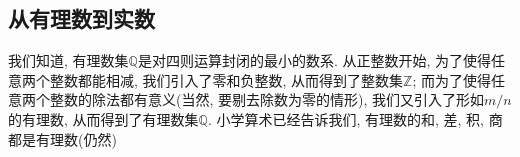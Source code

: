 
\subsection{从有理数到实数}

我们知道, 有理数集$\mathbb{Q}$是对四则运算封闭的最小的数系. 从正整数开始, 为了使得任意两个整数都能相减, 我们引入了零和负整数, 从而得到了整数集$\mathbb{Z}$; 而为了使得任意两个整数的除法都有意义(当然, 要剔去除数为零的情形), 我们又引入了形如$m/n$的有理数, 从而得到了有理数集$\mathbb{Q}$. 小学算术已经告诉我们, 有理数的和, 差, 积, 商都是有理数(仍然)